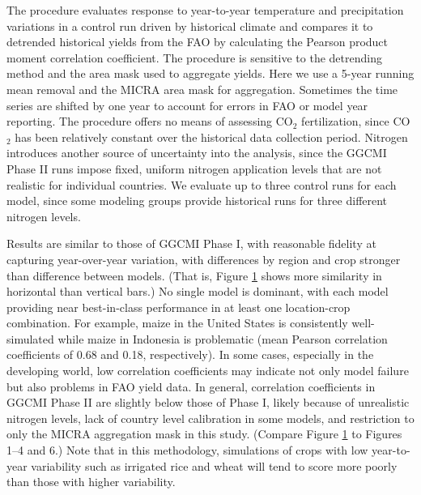 \documentclass[gmd, manuscript]{copernicus} %
\begin{document}
\begin{figure}[t]
    \label{fig:simulation_val}
\end{figure}

The \citet{muller_global_2017} procedure evaluates response to year-to-year temperature and precipitation variations in a control run driven by historical climate and compares it to detrended historical yields from the FAO \citep{FAOSTAT} by calculating the Pearson product moment correlation coefficient. The procedure is sensitive to the detrending method and the area mask used to aggregate yields. Here we use a 5-year running mean removal and the MICRA area mask for aggregation. Sometimes the time series are shifted by one year to account for errors in FAO or model year reporting. The procedure offers no means of assessing CO$_2$ fertilization, since CO$_2$ has been relatively constant over the historical data collection period. Nitrogen introduces another source of uncertainty into the analysis, since the GGCMI Phase II runs impose fixed, uniform nitrogen application levels that are not realistic for individual countries. We evaluate up to three control runs for each model, since some modeling groups provide historical runs for three different nitrogen levels. 

Results are similar to those of GGCMI Phase I, with reasonable fidelity at capturing year-over-year variation, with differences by region and crop stronger than difference between models. (That is, Figure \ref{fig:simulation_val} shows more similarity in horizontal than vertical bars.) No single model is dominant, with each model providing near best-in-class performance in at least one location-crop combination. For example, maize in the United States is consistently well-simulated while maize in Indonesia is problematic (mean Pearson correlation coefficients of 0.68 and 0.18, respectively). In some cases, especially in the developing world, low correlation coefficients may indicate not only model failure but also problems in FAO yield data. 
In general, correlation coefficients in GGCMI Phase II are slightly below those of Phase I, likely because of unrealistic nitrogen levels, lack of country level calibration in some models, and restriction to only the MICRA aggregation mask in this study. (Compare Figure \ref{fig:simulation_val} to \citet{muller_global_2017} Figures 1--4 and 6.) Note that in this methodology, simulations of crops with low year-to-year variability such as irrigated rice and wheat will tend to score more poorly than those with higher variability.
\end{document}
